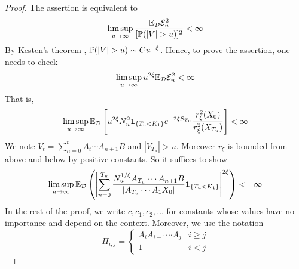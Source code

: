 \documentclass[aoas,preprint]{imsart}
\numberwithin{equation}{section}
\theoremstyle{plain}
\begin{document}
\begin{proof}\setcounter{case}{0}
  The assertion is equivalent to
  \[
  \limsup_{u \to \infty} {\E_{\mathcal D} \mathcal E_u^2 \over [\P(|V|
    > u)]^2} < \infty
  \]
  By Kesten's theorem \cite{kesten:1973},
  $\P(|V| > u) \sim C u^{-\xi}$.
  Hence, to prove the assertion, one needs to check
  \[
  \limsup_{u \to \infty} u^{2\xi}\E_{\mathcal D} \mathcal E_u^2
  <
  \infty
  \]
That is,
  \[
  \limsup_{u \to \infty} \E_{\mathcal D}
  \left[
    u^{2\xi}
    N_u^2 \1{T_u < K_1} e^{-2\xi S_{T_u}} {r_\xi^2(X_0)
      \over r_\xi^2(X_{T_u})}
  \right] < \infty
  \]
  We note $V_t = \sum_{n=0}^t A_{t} \cdots A_{n+1} B$ and
  $|V_{T_u}| > u$. Moreover $r_\xi$ is bounded
  from above and below by positive constants. So it suffices to show
  \begin{eqnarray}
    \limsup_{u \to \infty} \E_{\mathcal D} \left(
      \left|
        \sum_{n=0}^{T_u}
        \frac{
          N_u^{1/\xi} A_{T_u} \cdots A_{n+1} B 
        }{
          |A_{T_u} \cdots A_1 X_0|
        }
        \1{T_u < K_1}
      \right|^{2 \xi}
    \right) &<& \infty \label{eq:efficiency_target}
  \end{eqnarray}
  In the rest of the proof, we write $c, c_1, c_2, \dots$ for
  constants whose values have no importance and depend on the
  context. Moreover, we use the notation
  \[
  \Pi_{i,j} = \left\{
    \begin{array}{ll}
      A_i A_{i-1} \cdots A_j & i \geq j \\
      1 & i < j
    \end{array}
  \right.
  \]


\end{proof}
\end{document}
